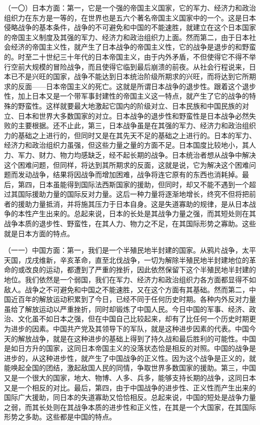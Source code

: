 （一〇）日本方面：第一，它是一个强的帝国主义国家，它的军力、经济力和政治组织力在东方是一等的，在世界也是五六个著名帝国主义国家中的一个。这是日本侵略战争的基本条件，战争的不可避免和中国的不能速胜，就建立在这个日本国家的帝国主义制度及其强的军力、经济力和政治组织力上面。然而第二，由于日本社会经济的帝国主义性，就产生了日本战争的帝国主义性，它的战争是退步的和野蛮的。时至二十世纪三十年代的日本帝国主义，由于内外矛盾，不但使得它不得不举行空前大规模的冒险战争，而且使得它临到最后崩溃的前夜。从社会行程说来，日本已不是兴旺的国家，战争不能达到日本统治阶级所期求的兴旺，而将达到它所期求的反面——日本帝国主义的死亡。这就是所谓日本战争的退步性。跟着这个退步性，加上日本又是一个带军事封建性的帝国主义这一特点，就产生了它的战争的特殊的野蛮性。这样就要最大地激起它国内的阶级对立、日本民族和中国民族的对立、日本和世界大多数国家的对立。日本战争的退步性和野蛮性是日本战争必然失败的主要根据。还不止此，第三，日本战争虽是在其强的军力、经济力和政治组织力的基础之上进行的，但同时又是在其先天不足的基础之上进行的。日本的军力、经济力和政治组织力虽强，但这些力量之量的方面不足。日本国度比较地小，其人力、军力、财力、物力均感缺乏，经不起长期的战争。日本统治者想从战争中解决这个困难问题，但同样，将达到其所期求的反面，这就是说，它为解决这个困难问题而发动战争，结果将因战争而增加困难，战争将连它原有的东西也消耗掉。最后，第四，日本虽能得到国际法西斯国家的援助，但同时，却又不能不遇到一个超过其国际援助力量的国际反对力量。这后一种力量将逐渐地增长，终究不但将把前者的援助力量抵消，并将施其压力于日本自身。这是失道寡助的规律，是从日本战争的本性产生出来的。总起来说，日本的长处是其战争力量之强，而其短处则在其战争本质的退步性、野蛮性，在其人力、物力之不足，在其国际形势之寡助。这些就是日本方面的特点。

（一一）中国方面：第一，我们是一个半殖民地半封建的国家。从鸦片战争，太平天国，戊戌维新，辛亥革命，直至北伐战争，一切为解除半殖民地半封建地位的革命的或改良的运动，都遭到了严重的挫折，因此依然保留下这个半殖民地半封建的地位。我们依然是一个弱国，我们在军力、经济力和政治组织力各方面都显得不如敌人。战争之不可避免和中国之不能速胜，又在这个方面有其基础。然而第二，中国近百年的解放运动积累到了今日，已经不同于任何历史时期。各种内外反对力量虽给了解放运动以严重挫折，同时却锻炼了中国人民。今日中国的军事、经济、政治、文化虽不如日本之强，但在中国自己比较起来，却有了比任何一个历史时期更为进步的因素。中国共产党及其领导下的军队，就是这种进步因素的代表。中国今天的解放战争，就是在这种进步的基础上得到了持久战和最后胜利的可能性。中国是如日方升的国家，这同日本帝国主义的没落状态恰是相反的对照。中国的战争是进步的，从这种进步性，就产生了中国战争的正义性。因为这个战争是正义的，就能唤起全国的团结，激起敌国人民的同情，争取世界多数国家的援助。第三，中国又是一个很大的国家，地大、物博、人多、兵多，能够支持长期的战争，这同日本又是一个相反的对比。最后，第四，由于中国战争的进步性、正义性而产生出来的国际广大援助，同日本的失道寡助又恰恰相反。总起来说，中国的短处是战争力量之弱，而其长处则在其战争本质的进步性和正义性，在其是一个大国家，在其国际形势之多助。这些都是中国的特点。

